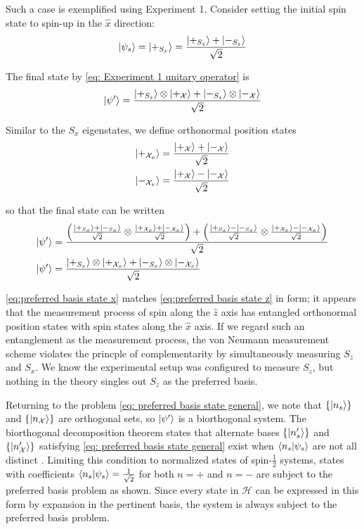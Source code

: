 Such a case is exemplified using Experiment 1. Consider setting the initial spin state to spin-up in the $\hat{x}$ direction:
\begin{align}
  \ket{\psi_s} = \ket{+_{S_x}} = \frac{\ket{+_{S_z}} + \ket{-_{S_z}}}{\sqrt{2}}
\end{align}

The final state by \autoref{eq: Experiment 1 unitary operator} is
\begin{align} \label{eq:preferred basis state z}
  \ket{\psi'} = \frac{\ket{+_{S_z}}\otimes\ket{+_{\mathcal{X}}} + \ket{-_{S_z}}\otimes\ket{-_{\mathcal{X}}}}{\sqrt{2}}
\end{align}

Similar to the $S_x$ eigenstates, we define orthonormal position states
\begin{align}
  \ket{+_{{\mathcal{X}}_x}} = \frac{\ket{+_{\mathcal{X}}} + \ket{-_{\mathcal{X}}}}{\sqrt{2}} \\ \nonumber
  \ket{-_{{\mathcal{X}}_x}} = \frac{\ket{+_{\mathcal{X}}} - \ket{-_{\mathcal{X}}}}{\sqrt{2}}
\end{align}

so that the final state can be written
\begin{align} \label{eq:preferred basis state x}
  \ket{\psi'} &= \frac{ \left(\frac{\ket{+_{S_x}} + \ket{-_{S_x}}}{\sqrt{2}} \otimes \frac{\ket{+_{{\mathcal{X}}_x}} + \ket{-_{{\mathcal{X}}_x}}}{\sqrt{2}} \right) +  \left(\frac{\ket{+_{S_x}} - \ket{-_{S_x}}}{\sqrt{2}} \otimes \frac{\ket{+_{{\mathcal{X}}_x}} - \ket{-_{{\mathcal{X}}_x}}}{\sqrt{2}} \right) }{\sqrt{2}} \\ \nonumber
  \ket{\psi'} &= \frac{\ket{+_{S_x}} \otimes \ket{+_{{\mathcal{X}}_x}} + \ket{-_{S_x}} \otimes \ket{-_{{\mathcal{X}}_x}}}{\sqrt{2}}
\end{align}

\autoref{eq:preferred basis state x} matches \autoref{eq:preferred basis state z} in form; it appears that the measurement process of spin along the $\hat{z}$ axis has entangled orthonormal position states with spin states along the $\hat{x}$ axis. If we regard such an entanglement as the measurement process, the von Neumann measurement scheme violates the princple of complementarity by simultaneously measuring $S_z$ and $S_x$. We know the experimental setup was configured to measure $S_z$, but nothing in the theory singles out $S_z$ as the preferred basis.

Returning to the problem \autoref{eq: preferred basis state general}, we note that $\{ \ket{n_s} \}$ and $\{ \ket{n_\mathcal{X}} \}$ are orthogonal sets, so $\ket{\psi'}$ is a biorthogonal system. The biorthogonal decomposition theorem states that alternate bases $\{ \ket{n'_s} \}$ and $\{ \ket{n'_\mathcal{X}} \}$ satisfying \autoref{eq: preferred basis state general} exist when $\braket{n_s | \psi_s}$ are not all distinct \cite{Elby}. Limiting this condition to normalized states of spin-$\frac{1}{2}$ systems, states with coefficients $\braket{n_s | \psi_s} = \frac{1}{\sqrt{2}}$ for both $n = +$ and $n = -$ are subject to the preferred basis problem as shown. Since every state in $\mathcal{H}$ can be expressed in this form by expansion in the pertinent basis, the system is always subject to the preferred basis problem.

